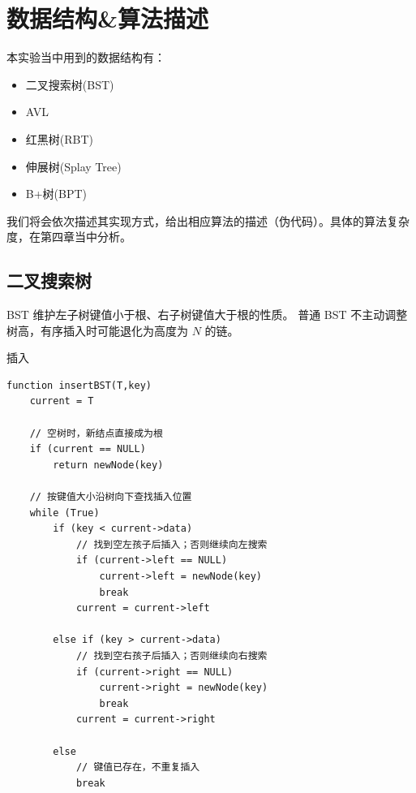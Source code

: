 \documentclass[openany]{book}
\begin{document}
\chapter{数据结构\&算法描述}
本实验当中用到的数据结构有：
\begin{itemize}
    \item 二叉搜索树(BST)
    \item AVL
    \item 红黑树(RBT)
    \item 伸展树(Splay Tree)
    \item B+树(BPT)
\end{itemize}

我们将会依次描述其实现方式，给出相应算法的描述（伪代码）。具体的算法复杂度，在第四章当中分析。

\section{二叉搜索树}
BST 维护左子树键值小于根、右子树键值大于根的性质。
普通 BST 不主动调整树高，有序插入时可能退化为高度为 $N$ 的链。

插入
\begin{lstlisting}
function insertBST(T,key)
    current = T

    // 空树时，新结点直接成为根
    if (current == NULL)
        return newNode(key)

    // 按键值大小沿树向下查找插入位置
    while (True)
        if (key < current->data)
            // 找到空左孩子后插入；否则继续向左搜索
            if (current->left == NULL)
                current->left = newNode(key)
                break
            current = current->left
            
        else if (key > current->data)
            // 找到空右孩子后插入；否则继续向右搜索
            if (current->right == NULL)
                current->right = newNode(key)
                break
            current = current->right
        
        else
            // 键值已存在，不重复插入
            break
\end{lstlisting}
\end{document}
